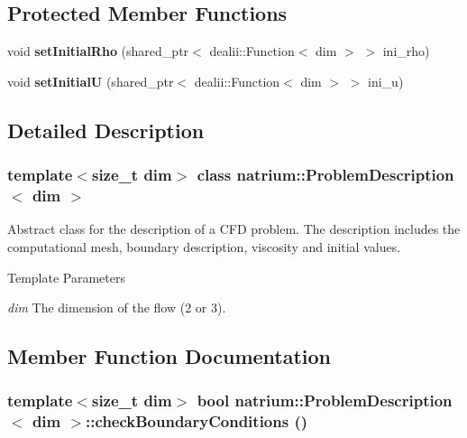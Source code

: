 \subsection*{Protected Member Functions}
\begin{DoxyCompactItemize}
\item 
\hypertarget{classnatrium_1_1ProblemDescription_a71ca18f3f0cdeb37ce22b200336c8f06}{
void {\bfseries setInitialRho} (shared\_\-ptr$<$ dealii::Function$<$ dim $>$ $>$ ini\_\-rho)}
\label{classnatrium_1_1ProblemDescription_a71ca18f3f0cdeb37ce22b200336c8f06}

\item 
\hypertarget{classnatrium_1_1ProblemDescription_a43da3bc535ee15b64f76d1d4cecf16a3}{
void {\bfseries setInitialU} (shared\_\-ptr$<$ dealii::Function$<$ dim $>$ $>$ ini\_\-u)}
\label{classnatrium_1_1ProblemDescription_a43da3bc535ee15b64f76d1d4cecf16a3}

\end{DoxyCompactItemize}


\subsection{Detailed Description}
\subsubsection*{template$<$size\_\-t dim$>$ class natrium::ProblemDescription$<$ dim $>$}

Abstract class for the description of a CFD problem. The description includes the computational mesh, boundary description, viscosity and initial values. 
\begin{DoxyTemplParams}{Template Parameters}
\item[{\em dim}]The dimension of the flow (2 or 3). \end{DoxyTemplParams}


\subsection{Member Function Documentation}
\hypertarget{classnatrium_1_1ProblemDescription_aed8ec93fcba6c0b78c04ef91b8703f7a}{
\subsubsection[{checkBoundaryConditions}]{\setlength{\rightskip}{0pt plus 5cm}template$<$size\_\-t dim$>$ bool {\bf natrium::ProblemDescription}$<$ dim $>$::checkBoundaryConditions ()}}
\label{classnatrium_1_1ProblemDescription_aed8ec93fcba6c0b78c04ef91b8703f7a}


